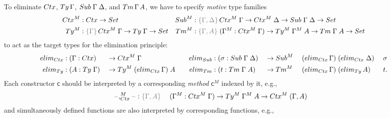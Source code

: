 \documentclass[a4paper,UKenglish,numberwithinsect,cleveref,thm-restate]{lipics-v2021}
\begin{document}
To eliminate $\Ctx$, $\Ty\,\Gamma$, $\Sub\;\Gamma\;\Delta$, and $\Tm\,\Gamma\,A$, we have to specify \emph{motive} type families
\begin{align*}
  \Ctx^M & : \Ctx \to \Set &
  \Sub^M & : \implicit{\Gamma, \Delta}\,\Ctx^M\;\Gamma \to \Ctx^M\;\Delta \to \Sub\;\Gamma\;\Delta \to \Set \\
  \Ty^M  & : \implicit{\Gamma}\,\Ctx^M\;\Gamma \to \Ty\;\Gamma \to \Set & 
  \Tm^M  & : \implicit{\Gamma, A}\; (\Gamma^M : \Ctx^M\;\Gamma) \to \Ty^M\;\Gamma^M\;A \to \Tm\;\Gamma\;A \to \Set
\end{align*}
to act as the target types for the elimination principle:
\begin{alignat*}{10}
  \elim_{\Ctx} & : (\Gamma : \Ctx)   && \to \Ctx^M\;\Gamma &
  \elim_{\Sub} & : (\sigma : \Sub\;\Gamma\;\Delta) && \to \Sub^M\; && (\elim_{\Ctx}\,\Gamma)\;(\elim_{\Ctx}\;\Delta)\;&&\sigma \\
  \elim_{\Ty}  & : (A : \Ty\;\Gamma) && \to \Ty^M\;(\elim_{\Ctx}\,\Gamma)\;A \quad
               & \elim_{\Tm}  & : (t : \Tm\;\Gamma\;A) && \to \Tm^M\; && (\elim_{\Ctx}\,\Gamma)\;(\elim_{\Ty}\,A)\;&&t.
\end{alignat*}
Each constructor $\mathsf{c}$ should be interpreted by a corresponding \emph{method} $\mathsf{c}^M$ indexed by it, e.g.,
\begin{alignat*}{3}
  \blank,_{\Ctx}^M\blank & : \implicit{\Gamma, A}\; && (\Gamma^M : \Ctx^M\;\Gamma) \to \Ty^M\;\Gamma^M\;A \to \Ctx^M\;(\Gamma, A) %
\end{alignat*}
and simultaneously defined functions are also interpreted by corresponding functions, e.g.,
\end{document}
